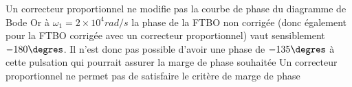 \ifprof
\begin{corrige}
Un correcteur proportionnel ne modifie pas la courbe de phase du diagramme de Bode Or à $\omega_1=2\times 10^4 \si{rad/s}$  la phase de la FTBO non corrigée (donc également pour la FTBO corrigée avec un correcteur proportionnel) vaut sensiblement $-180\degres$. Il n’est donc pas possible d’avoir une phase de $-135\degres$ à cette pulsation qui pourrait assurer la marge de phase souhaitée
Un correcteur proportionnel ne permet pas de satisfaire le critère de marge de phase

\end{corrige}
\else
\fi

